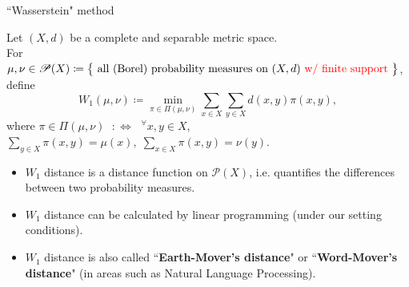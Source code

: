 \documentclass[aspectratio=169, bigfiles]{beamer}
\newcommand{\ninni}{{}^\forall} %
\def\:={\coloneqq} %
\def\red(#1){\textcolor{red}{#1}}
\begin{document}
\begin{frame}{``Wasserstein" method}
\vspace{-1mm}
\begin{definition}
{\small 
Let $(X,d)$ be a complete and separable metric space. \\
For $\mu,\nu\in\mathscr{P}(X)\:=\big\{\text{ all (Borel) probability measures on }(X,d)\text{ \red(w/ finite support) }\big\}$, define
$$
    W_1(\mu,\nu)\:=\min_{\pi\in\Pi(\mu,\nu)} \sum_{x\in X}\sum_{y\in X} d(x,y)\pi(x,y),
$$
where $\pi\in\Pi(\mu,\nu)$ $\;:\Leftrightarrow\;$ $\ninni x,y\in X$,\; $\sum_{y\in X}\pi(x,y)=\mu(x),\;\sum_{x\in X}\pi(x,y)=\nu(y)$. 
}
\end{definition}
\vspace{-2mm}
\begin{itemize}
    \item {\small $W_1$ distance is a distance function on $\mathscr{P}(X)$, i.e. quantifies the differences between two probability measures.}
    \item {\small $W_1$ distance can be calculated by linear programming (under our setting conditions).}
    \item {\small $W_1$ distance is also called ``\textbf{Earth-Mover's distance}" or ``\textbf{Word-Mover's distance}" (in areas such as Natural Language Processing).}
\end{itemize}
\end{frame}
\end{document}
